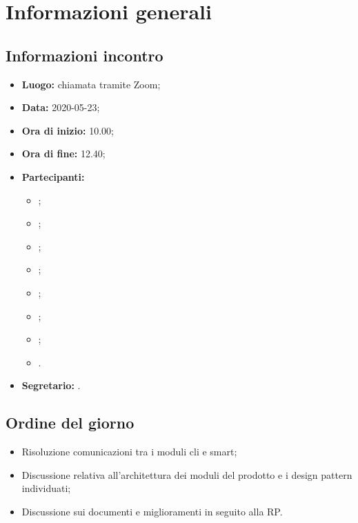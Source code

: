 \section{Informazioni generali}
\subsection{Informazioni incontro}
\begin{itemize}
	\item \textbf{Luogo:} chiamata tramite Zoom;
	\item \textbf{Data:} 2020-05-23;
	\item \textbf{Ora di inizio:} 10.00;
	\item \textbf{Ora di fine:} 12.40;
	\item \textbf{Partecipanti:}
		\begin{itemize}
			\item \VB;
			\item \LB;
			\item \NF;
			\item \EG;
			\item \FJ;
			\item \MP;
			\item \AS;
			\item \AZ.
		\end{itemize}
	\item \textbf{Segretario:} \FJ.
\end{itemize}

\subsection{Ordine del giorno}
\begin{itemize}
	\item Risoluzione comunicazioni tra i moduli cli e smart;
	\item Discussione relativa all'architettura dei moduli del prodotto e i design pattern individuati;
	\item Discussione sui documenti e miglioramenti in seguito alla RP.
\end{itemize}
